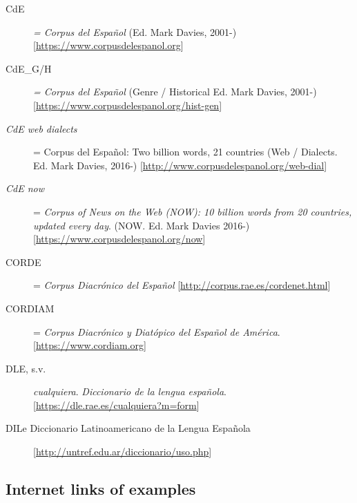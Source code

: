  \label{sec:7.1}
\begin{flushleft}
\sloppy
\begin{description}
\item[CdE] \textit{= Corpus del Español} (Ed. Mark Davies, 2001-) [\url{https://www.corpusdelespanol.org}]
\item[CdE\_G/H] \textit{= Corpus del Español} (Genre / Historical Ed. Mark Davies, 2001-) [\url{https://www.corpusdelespanol.org/hist-gen}]
\item[\textit{CdE web dialects}] = Corpus del Español: Two billion words, 21 countries (Web / Dialects. Ed. Mark Davies, 2016-) [\url{http://www.corpusdelespanol.org/web-dial}]
\item[\textit{CdE now}] = \textit{Corpus of News on the Web (NOW): 10 billion words from 20 countries, updated every day}. (NOW. Ed. Mark Davies 2016-) [\url{https://www.corpusdelespanol.org/now}]
\item[CORDE] = \textit{Corpus Diacrónico del Español} [\url{http://corpus.rae.es/cordenet.html}]
\item[CORDIAM] = \textit{Corpus Diacrónico y Diatópico del Español de América}. [\url{https://www.cordiam.org}]
\item[DLE, s.v.] \textit{cualquiera}. \textit{Diccionario de la lengua española}.
  [\url{https://dle.rae.es/cualquiera?m=form}{]}
\item[DILe Diccionario Latinoamericano de la Lengua Española]
  [\url{http://untref.edu.ar/diccionario/uso.php}]
\end{description}

 \label{sec:7.2}
\subsection*{Internet links of examples} \label{sec:7.2.1}



\end{flushleft}

